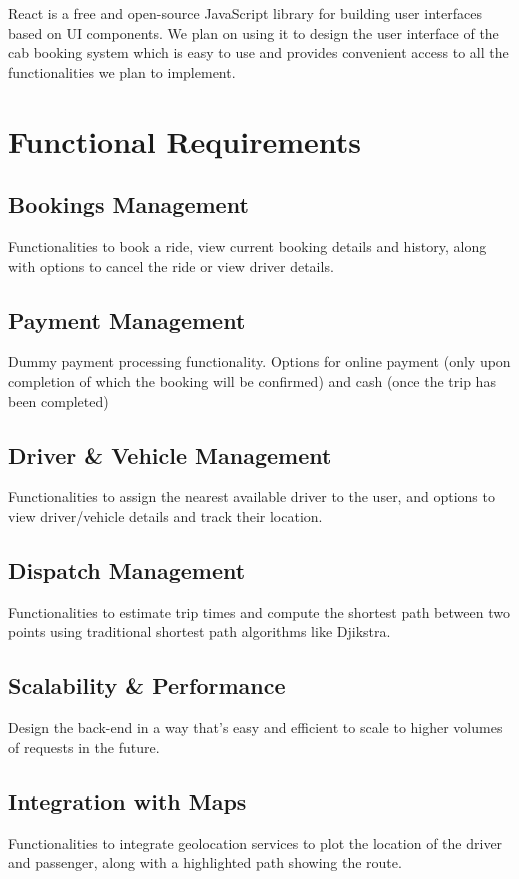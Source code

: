 \documentclass{article}
\begin{document}
React is a free and open-source JavaScript library for building user interfaces based on UI components. We plan on using it to design the user interface of the cab booking system which is easy to use and provides convenient access to all the functionalities we plan to implement.

\section{Functional Requirements}

\subsection{Bookings Management}
Functionalities to book a ride, view current booking details and history, along with options to cancel the ride or view driver details.

\subsection{Payment Management}
Dummy payment processing functionality. Options for online payment (only upon completion of which the booking will be confirmed) and cash (once the trip has been completed)

\subsection{Driver \& Vehicle Management}
Functionalities to assign the nearest available driver to the user, and options to view driver/vehicle details and track their location.

\subsection{Dispatch Management}
Functionalities to estimate trip times and compute the shortest path between two points using traditional shortest path algorithms like Djikstra.

\subsection{Scalability \& Performance}
Design the back-end in a way that’s easy and efficient to scale to higher volumes of requests in the future.

\subsection{Integration with Maps}
Functionalities to integrate geolocation services to plot the location of the driver and passenger, along with a highlighted path showing the route.
\end{document}

